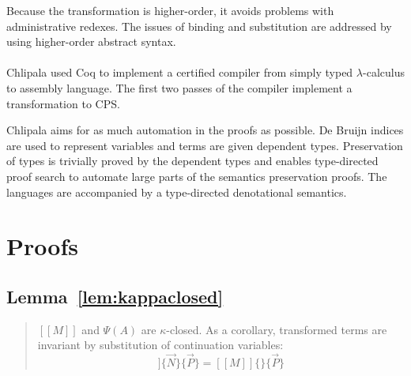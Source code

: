 \documentclass[a4paper,11pt,draft]{article}
\begin{document}
Because the transformation is higher-order, it avoids problems with
administrative redexes.
The issues of binding and substitution are addressed by using higher-order
abstract syntax.

\paragraph{}

Chlipala \cite{Chlipala-07} used Coq to implement a certified compiler from
simply typed $\lambda$-calculus to assembly language.
The first two passes of the compiler implement a transformation to CPS.

Chlipala aims for as much automation in the proofs as possible.
De Bruijn indices are used to represent variables and terms are given
dependent types.
Preservation of types is trivially proved by the dependent types and enables
type-directed proof search to automate large parts of the semantics
preservation proofs. The languages are accompanied by a type-directed
denotational semantics.


\appendix


\section{Proofs}\label{sec:proofs}


\subsection{Lemma~\ref{lem:kappaclosed}}

\begin{quote}
  $[\![M]\!]$ and $\Psi(A)$ are $\kappa$-closed. As a corollary, transformed
  terms are invariant by substitution of continuation variables:
  \begin{equation*}
    [\![M]\!]\{\vec{N}\}\{\vec{P}\} = [\![M]\!]\{\}\{\vec{P}\}
  \end{equation*}
\end{quote}
\end{document}
